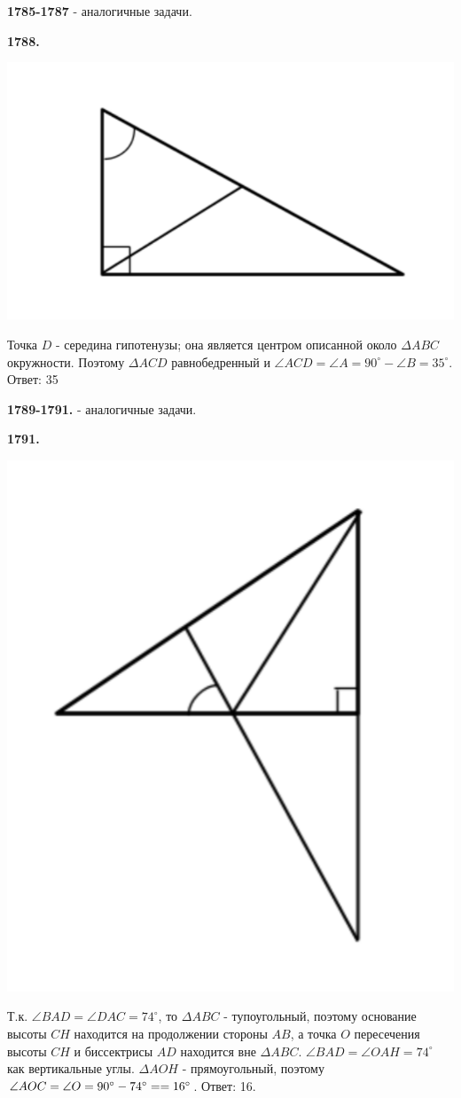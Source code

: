 \textbf{1785-1787} - аналогичные задачи.

\textbf{1788.}

{\centering \includegraphics[width=0.5\linewidth]{Geometry/Content/9.png}
	
}

Точка $D$ - середина гипотенузы; она является центром описанной около $\Delta ABC$ окружности. Поэтому $\Delta ACD$ равнобедренный и $\angle ACD = \angle A = 90^\circ - \angle B = 35^\circ.$ 
\newline \null \hspace*{\fill} Ответ: 35

\textbf{1789-1791.} - аналогичные задачи.

\clearpage 

\textbf{1791.}

{\centering \includegraphics[width=0.4\linewidth]{Geometry/Content/10.png}
	
}

Т.к. $\angle BAD = \angle DAC = 74^\circ$, то $\Delta ABC$ - тупоугольный, поэтому основание высоты $CH$ находится на продолжении стороны $AB$, а точка $O$ пересечения высоты $CH$ и биссектрисы $AD$ находится вне $\Delta ABC$. $\angle BAD = \angle OAH = 74^\circ$  как вертикальные углы. $\Delta AOH$ - прямоугольный, поэтому $\angle AOC = \angle O = 90^\circ - 74^\circ =\linebreak = 16^\circ$. \newline \null \hspace*{\fill} Ответ: 16.

